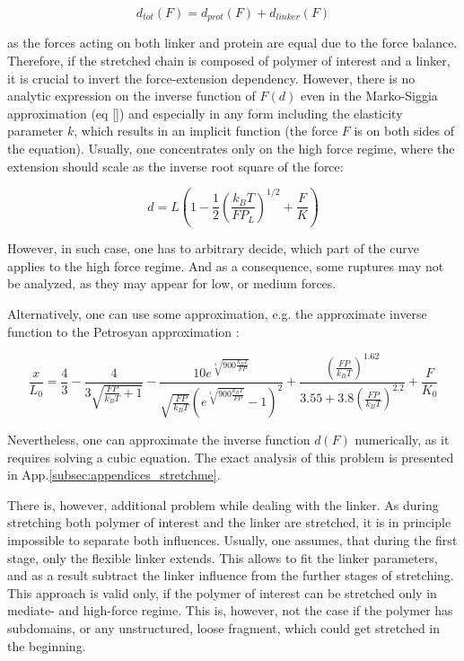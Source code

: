 \begin{equation}
    d_{tot}(F) = d_{prot}(F) + d_{linker}(F)
\end{equation}

as the forces acting on both linker and protein are equal due to the force balance.
Therefore, if the stretched chain is composed of polymer of interest and a linker, it is crucial to invert the force-extension dependency.
However, there is no analytic expression on the inverse function of $F(d)$ even in the Marko-Siggia approximation (eq \ref{}) and especially in any form including the elasticity parameter $k$, which results in an implicit function (the force $F$ is on both sides of the equation).
Usually, one concentrates only on the high force regime, where the extension should scale as the inverse root square of the force:

\begin{equation}
    d=L\left(1-{\frac {1}{2}}\left({\frac {k_{B}T}{FP_L}}\right)^{1/2}+{\frac {F}{K}}\right)
\end{equation}

However, in such case, one has to arbitrary decide, which part of the curve applies to the high force regime.
And as a consequence, some ruptures may not be analyzed, as they may appear for low, or medium forces.

Alternatively, one can use some approximation, e.g. the approximate inverse function to the Petrosyan approximation \cite{petrosyan2017improved}:

\begin{equation}
    {\frac {x}{L_{0}}}={\frac {4}{3}}-{\frac {4}{3{\sqrt {{\frac {FP}{k_{B}T}}+1}}}}-{\frac {10e^{\sqrt[{4}]{900{\frac {k_{B}T}{FP}}}}}{{\sqrt {\frac {FP}{k_{B}T}}}\left(e^{\sqrt[{4}]{900{\frac {k_{B}T}{FP}}}}-1\right)^{2}}}+{\frac {\left({\frac {FP}{k_{B}T}}\right)^{1.62}}{3.55+3.8\left({\frac {FP}{k_{B}T}}\right)^{2.2}}}+{\frac {F}{K_{0}}}
\end{equation}

Nevertheless, one can approximate the inverse function $d(F)$ numerically, as it requires solving a cubic equation.
The exact analysis of this problem is presented in App.\ref{subsec:appendices_stretchme}.

There is, however, additional problem while dealing with the linker. As during stretching both polymer of interest and the linker are stretched, it is in principle impossible to separate both influences.
Usually, one assumes, that during the first stage, only the flexible linker extends.
This allows to fit the linker parameters, and as a result subtract the linker influence from the further stages of stretching.
This approach is valid only, if the polymer of interest can be stretched only in mediate- and high-force regime.
This is, however, not the case if the polymer has subdomains, or any unstructured, loose fragment, which could get stretched in the beginning.

